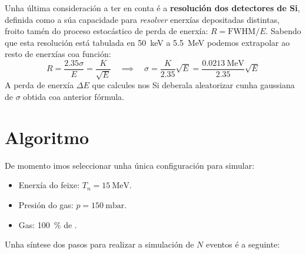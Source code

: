 \documentclass[11pt, a4paper]{article}
\begin{document}
Unha última consideración a ter en conta é a \textbf{resolución dos detectores de Si}, definida como a súa capacidade para \textit{resolver} enerxías depositadas distintas, froito tamén do proceso estocástico de perda de enerxía: $R = \textrm{FWHM} / E$. Sabendo que esta resolución está tabulada en \qty{50}{\keV} a \qty{5.5}{\MeV} podemos extrapolar ao resto de enerxías coa función:
\begin{equation*}
    R = \frac{2.35 \sigma}{E} = \frac{K}{\sqrt{E}} \quad \implies \quad \sigma = \frac{K}{2.35}\sqrt{E} = \frac{\qty{0.0213}{\MeV}}{2.35} \sqrt{E}
\end{equation*}
A perda de enerxía $\Delta E$ que calcules nos Si deberala aleatorizar cunha gaussiana de $\sigma$ obtida coa anterior fórmula.

\section{Algoritmo}
De momento imos seleccionar unha única configuración para simular:
\begin{itemize}
    \item Enerxía do feixe: $T_{n} = \qty{15}{\MeV}$.
    \item Presión do gas: $p = \qty{150}{\milli\bar}$.
    \item Gas: \qty{100}{\percent} de .
\end{itemize}
Unha síntese dos pasos para realizar a simulación de $N$ eventos é a seguinte:
\end{document}
